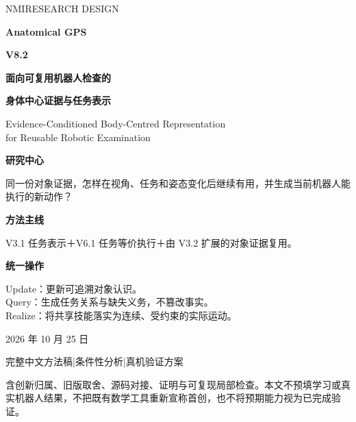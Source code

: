 \documentclass[UTF8,11pt,a4paper,fontset=fandol]{ctexart}
\numberwithin{equation}{section}
\theoremstyle{definition}
\begin{document}
\begin{titlepage}
\vspace*{8mm}
{\Large\color{teal}\sffamily NMI\quad RESEARCH DESIGN}\par
\vspace{12mm}
{\fontsize{32}{40}\selectfont\bfseries\color{ink}Anatomical GPS}\par
\vspace{3mm}
{\fontsize{24}{32}\selectfont\bfseries\color{ink}V8.2}\par
\vspace{10mm}
{\LARGE\bfseries 面向可复用机器人检查的}\par
\vspace{2mm}
{\LARGE\bfseries 身体中心证据与任务表示}\par
\vspace{6mm}
{\large\color{muted}Evidence-Conditioned Body-Centred Representation\\
for Reusable Robotic Examination}\par
\vspace{11mm}
\begin{keybox}
\textbf{研究中心}\par
同一份对象证据，怎样在视角、任务和姿态变化后继续有用，并生成当前机器人能执行的新动作？
\medskip\par
\textbf{方法主线}\par
V3.1 任务表示＋V6.1 任务等价执行＋由 V3.2 扩展的对象证据复用。
\medskip\par
\textbf{统一操作}\par
Update：更新可追溯对象认识。\\
Query：生成任务关系与缺失义务，不篡改事实。\\
Realize：将共享技能落实为连续、受约束的实际运动。
\end{keybox}
\vfill
{\large 2026 年 10 月 25 日}\par
\vspace{3mm}
{\color{muted}完整中文方法稿\quad|\quad 条件性分析\quad|\quad 真机验证方案}\par
\vspace{3mm}
{\small 含创新归属、旧版取舍、源码对接、证明与可复现局部检查。本文不预填学习或真实机器人结果，不把既有数学工具重新宣称首创，也不将预期能力视为已完成验证。}
\end{titlepage}
\end{document}
